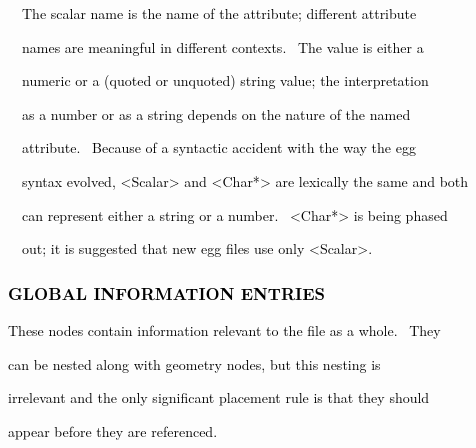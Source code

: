 \documentclass[a4paper]{article}
\newcommand\textstyleOOoComputerKeyWord[1]{\textrm{\textcolor[rgb]{0.0,0.0,0.5019608}{#1}}}
\begin{document}
{\color{black}
\textstyleOOoComputerKeyWord{\textcolor{black}{\ \ The scalar name is the name of the attribute; different attribute}}}

{\color{black}
\textstyleOOoComputerKeyWord{\textcolor{black}{\ \ names are meaningful in different contexts. \ The value is either
a}}}

{\color{black}
\textstyleOOoComputerKeyWord{\textcolor{black}{\ \ numeric or a (quoted or unquoted) string value; the interpretation}}}

{\color{black}
\textstyleOOoComputerKeyWord{\textcolor{black}{\ \ as a number or as a string depends on the nature of the named}}}

{\color{black}
\textstyleOOoComputerKeyWord{\textcolor{black}{\ \ attribute. \ Because of a syntactic accident with the way the egg}}}

{\color{black}
\textstyleOOoComputerKeyWord{\textcolor{black}{\ \ syntax evolved, {\textless}Scalar{\textgreater} and
{\textless}Char*{\textgreater} are lexically the same and both}}}

{\color{black}
\textstyleOOoComputerKeyWord{\textcolor{black}{\ \ can represent either a string or a number.
\ {\textless}Char*{\textgreater} is being phased}}}

{\color{black}
\textstyleOOoComputerKeyWord{\textcolor{black}{\ \ out; it is suggested that new egg files use only
{\textless}Scalar{\textgreater}.}}}


\bigskip


\bigskip


\bigskip

\subsubsection[GLOBAL INFORMATION ENTRIES]{\textstyleOOoComputerKeyWord{\textcolor{black}{GLOBAL INFORMATION ENTRIES}}}
\hypertarget{RefHeading7676869075401}{}
\bigskip

{\color{black}
\textstyleOOoComputerKeyWord{\textcolor{black}{These nodes contain information relevant to the file as a whole.
\ They}}}

{\color{black}
\textstyleOOoComputerKeyWord{\textcolor{black}{can be nested along with geometry nodes, but this nesting is}}}

{\color{black}
\textstyleOOoComputerKeyWord{\textcolor{black}{irrelevant and the only significant placement rule is that they should}}}

{\color{black}
\textstyleOOoComputerKeyWord{\textcolor{black}{appear before they are referenced.}}}
\end{document}
